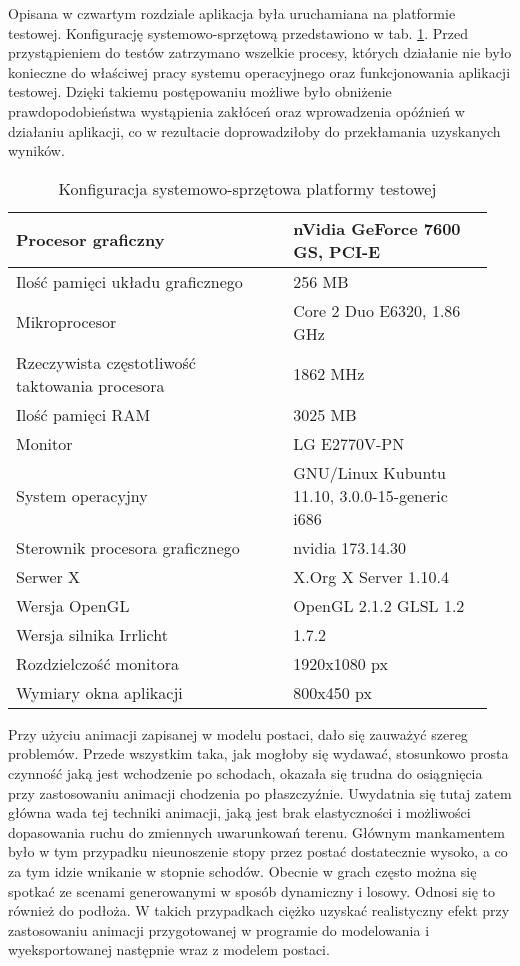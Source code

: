 \documentclass[11pt]{mwrep}
\begin{document}
Opisana w czwartym rozdziale aplikacja była uruchamiana na platformie testowej. Konfigurację systemowo-sprzętową przedstawiono w tab. \ref{tab:conf}. Przed przystąpieniem do testów zatrzymano wszelkie procesy, których działanie nie było konieczne do właściwej pracy systemu operacyjnego oraz funkcjonowania aplikacji testowej. Dzięki takiemu postępowaniu możliwe było obniżenie prawdopodobieństwa wystąpienia zakłóceń oraz wprowadzenia opóźnień w działaniu aplikacji, co w rezultacie doprowadziłoby do przekłamania uzyskanych wyników.

\begin{table}[p]

\begin{center}
\footnotesize
\begin{tabular}{|p{0.55\linewidth}||p{0.4\linewidth}|} 
\hline

Procesor graficzny & nVidia GeForce 7600 GS, PCI-E\\ \hline
Ilość pamięci układu graficznego & 256 MB \\ \hline
Mikroprocesor & Core 2 Duo E6320, 1.86 GHz\\ \hline
Rzeczywista częstotliwość taktowania procesora & 1862 MHz \\ \hline 
Ilość pamięci RAM & 3025 MB \\ \hline
Monitor & LG E2770V-PN \\ \hline
 \hline
System operacyjny & GNU/Linux Kubuntu 11.10, 3.0.0-15-generic i686\\ \hline
Sterownik procesora graficznego & nvidia 173.14.30 \\ \hline
Serwer X & X.Org X Server 1.10.4 \\ \hline
Wersja OpenGL & OpenGL 2.1.2 GLSL 1.2 \\ \hline
Wersja silnika Irrlicht & 1.7.2 \\ \hline
Rozdzielczość monitora & 1920x1080 px \\  \hline
Wymiary okna aplikacji & 800x450 px \\ \hline
  \end{tabular}
\end{center}
  \caption{Konfiguracja systemowo-sprzętowa platformy testowej}
\label{tab:conf}
\end{table}


Przy użyciu animacji zapisanej w modelu postaci, dało się zauważyć szereg problemów. Przede wszystkim taka, jak mogłoby się wydawać, stosunkowo prosta czynność jaką jest wchodzenie po schodach, okazała się trudna do osiągnięcia przy zastosowaniu animacji chodzenia po płaszczyźnie. Uwydatnia się tutaj zatem główna wada tej techniki animacji, jaką jest brak elastyczności i możliwości dopasowania ruchu do zmiennych uwarunkowań terenu. Głównym mankamentem było w tym przypadku nieunoszenie stopy przez postać dostatecznie wysoko, a co za tym idzie wnikanie w stopnie schodów. Obecnie w grach często można się spotkać ze scenami generowanymi w sposób dynamiczny i losowy. Odnosi się to również do podłoża. W takich przypadkach ciężko uzyskać realistyczny efekt przy zastosowaniu animacji przygotowanej w programie do modelowania i wyeksportowanej następnie wraz z modelem postaci. 
\end{document}

